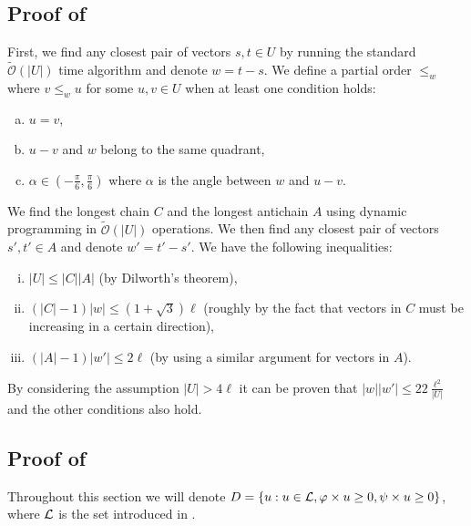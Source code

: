 \documentclass[11pt]{article}
\newcommand{\tO}{\tilde{\mathcal{O}}}
\newcommand{\set}[1]{\left\lbrace #1 \right\rbrace}
\theoremstyle{plain}
\theoremstyle{definition}
\theoremstyle{remark}
\begin{document}
\subsection{Proof of } \label{get_periods_proof}
First, we find any closest pair of vectors $s, t \in U$ by running the standard $\tO(|U|)$ time algorithm and denote $w = t - s$.
We define a partial order $\le_{w}$ where $v \le_w u$ for some $u, v \in U$ when at least one condition holds:
\begin{enumerate}[(a)]
	\item $u = v$,
	\item $u - v$ and $w$ belong to the same quadrant,
	\item $\alpha \in (-\frac{\pi}{6}, \frac{\pi}{6})$ where $\alpha$ is the angle between $w$ and $u - v$.
\end{enumerate}
We find the longest chain $C$ and the longest antichain $A$ using dynamic programming in $\tO(|U|)$ operations.
We then find any closest pair of vectors $s', t' \in A$ and denote $w' = t' - s'$.
We have the following inequalities:
\begin{enumerate}[(i)]
	\item $|U| \le |C| |A|$ (by Dilworth's theorem),
	\item $(|C| - 1) |w| \le (1 + \sqrt{3})\ell$ (roughly by the fact that vectors in $C$ must be increasing in a certain direction), 
	\item $(|A| - 1) |w'| \le 2 \ell$ (by using a similar argument for vectors in $A$).
\end{enumerate}
By considering the assumption $|U| > 4\ell$ it can be proven that $|w||w'| \le 22 \frac{\ell^2}{|U|}$ and the other conditions also hold.


\newcommand{\W}{\mathcal{W}}
\subsection{Proof of } \label{subparquet_convolution_proof}
Throughout this section we will denote $D = \set{u : u \in \L, \h{u} \ge 0, \s{u} \ge 0}$, where $\mathcal{L}$ is the set introduced in .
\end{document}
